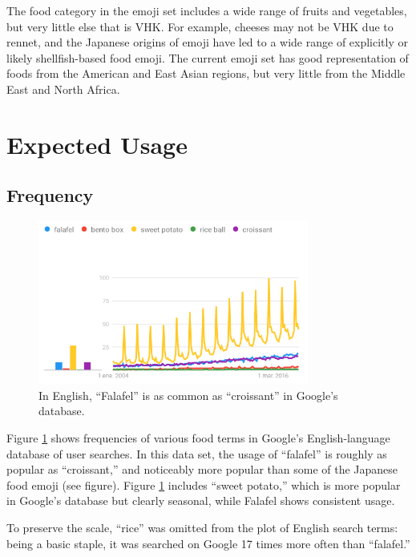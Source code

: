 \documentclass[a4paper,10pt]{article}
\begin{document}
The food category in the emoji set includes a wide range of fruits and vegetables, but
very little else that is VHK. For example, cheeses may not be VHK due to rennet, and the
Japanese origins of emoji have led to a wide range of explicitly or likely
shellfish-based food emoji. The current emoji set has good representation of foods
from the American and East Asian regions, but very little from the Middle East and
North Africa.

\section{Expected Usage}

\subsection{Frequency}

\begin{figure}
\begin{center}
\includegraphics[width=3.5in]{trends.png}
\end{center}
\caption{In English, ``Falafel'' is as common as ``croissant'' in Google's database.}
\label{engplot}
\end{figure}


Figure \ref{engplot} shows frequencies of various food terms in Google's English-language
database of user searches.  In this data set, the usage of ``falafel'' is roughly as popular as
``croissant,'' and noticeably more popular than some of the Japanese food emoji
(see figure).  Figure \ref{engplot} includes ``sweet potato,'' which is more popular
in Google's database but clearly seasonal, while Falafel shows consistent usage.

To preserve the scale, ``rice'' was omitted from the plot of English search terms:
being a basic staple, it was searched on Google 17 times more often than ``falafel.''
\end{document}
